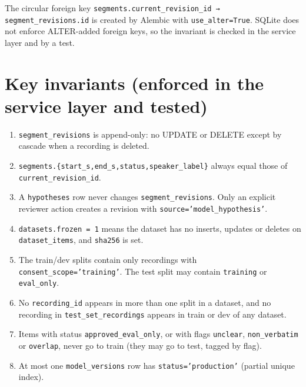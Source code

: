 \documentclass[11pt]{article}
\begin{document}
The circular foreign key \texttt{segments.\allowbreak{}current\_\allowbreak{}revision\_\allowbreak{}id → segment\_\allowbreak{}revisions.\allowbreak{}id} is created by Alembic with \texttt{use\_\allowbreak{}alter=\allowbreak{}True}. SQLite does not enforce ALTER-added foreign keys, so the invariant is checked in the service layer and by a test.

\hypertarget{key-invariants-enforced-in-the-service-layer-and-tested}{%
\section{Key invariants (enforced in the service layer and tested)}\label{key-invariants-enforced-in-the-service-layer-and-tested}}

\begin{enumerate}
\def\labelenumi{\arabic{enumi}.}
\tightlist
\item
  \texttt{segment\_\allowbreak{}revisions} is append-only: no UPDATE or DELETE except by cascade when a recording is deleted.
\item
  \texttt{segments.\allowbreak{}\{start\_\allowbreak{}s,\allowbreak{}end\_\allowbreak{}s,\allowbreak{}status,\allowbreak{}speaker\_\allowbreak{}label\}} always equal those of \texttt{current\_\allowbreak{}revision\_\allowbreak{}id}.
\item
  A \texttt{hypotheses} row never changes \texttt{segment\_\allowbreak{}revisions}. Only an explicit reviewer action creates a revision with \texttt{source=\allowbreak{}'model\_\allowbreak{}hypothesis'}.
\item
  \texttt{datasets.\allowbreak{}frozen =\allowbreak{} 1} means the dataset has no inserts, updates or deletes on \texttt{dataset\_\allowbreak{}items}, and \texttt{sha256} is set.
\item
  The train/dev splits contain only recordings with \texttt{consent\_\allowbreak{}scope=\allowbreak{}'training'}. The test split may contain \texttt{training} or \texttt{eval\_\allowbreak{}only}.
\item
  No \texttt{recording\_\allowbreak{}id} appears in more than one split in a dataset, and no recording in \texttt{test\_\allowbreak{}set\_\allowbreak{}recordings} appears in train or dev of any dataset.
\item
  Items with status \texttt{approved\_\allowbreak{}eval\_\allowbreak{}only}, or with flags \texttt{unclear}, \texttt{non\_\allowbreak{}verbatim} or \texttt{overlap}, never go to train (they may go to test, tagged by flag).
\item
  At most one \texttt{model\_\allowbreak{}versions} row has \texttt{status=\allowbreak{}'production'} (partial unique index).
\end{enumerate}
\end{document}
